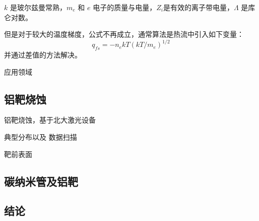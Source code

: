 $k$ 是玻尔兹曼常熟，$m_e$ 和 $e$ 电子的质量与电量，$Z_i$是有效的离子带电量，$\Lambda$
是库仑对数。

但是对于较大的温度梯度，公式不再成立，通常算法是热流中引入如下变量：
\begin{equation}
\label{eqn:freeStream}
q_{fs}=-n_e k T (k T / m_e)^{1/2}
\end{equation} 
并通过差值的方法解决。






应用领域



\subsection{铝靶烧蚀}

铝靶烧蚀，基于北大激光设备

典型分布以及 数据扫描

靶前表面

\subsection{碳纳米管及铝靶}

\subsection{结论}
